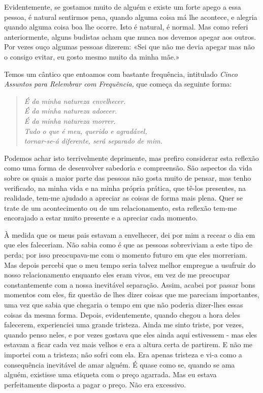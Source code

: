 Evidentemente, se gostamos muito de alguém e existe um forte apego a
essa pessoa, é natural sentirmos pena, quando alguma coisa má lhe
acontece, e alegria quando alguma coisa boa lhe ocorre. Isto é natural,
é normal. Mas como referi anteriormente, alguns budistas acham que nunca
nos devemos apegar aos outros. Por vezes ouço algumas pessoas dizerem:
«Sei que não me devia apegar mas não o consigo evitar, eu gosto mesmo
muito da minha mãe.»

Temos um cântico que entoamos com bastante frequência, intitulado
\emph{Cinco Assuntos para Relembrar com Frequência,} que começa da
seguinte forma:

\begin{quote}
\itshape
É da minha natureza envelhecer.\\
É da minha natureza adoecer.\\
É da minha natureza morrer.\\
Tudo o que é meu, querido e agradável,\\
tornar-se-á diferente, será separado de mim.
\end{quote}

Podemos achar isto terrivelmente deprimente, mas prefiro considerar esta
reflexão como uma forma de desenvolver sabedoria e compreensão. São
aspectos da vida sobre os quais a maior parte das pessoas não gosta
muito de pensar, mas tenho verificado, na minha vida e na minha própria
prática, que tê-los presentes, na realidade, tem-me ajudado a apreciar
as coisas de forma mais plena. Quer se trate de um acontecimento ou de
um relacionamento, esta reflexão tem-me encorajado a estar muito
presente e a apreciar cada momento.

À medida que os meus pais estavam a envelhecer, dei por mim a recear o
dia em que eles faleceriam. Não sabia como é que as pessoas sobreviviam
a este tipo de perda; por isso \mbox{preocupava-me} com o momento futuro em que
eles morreriam. Mas depois percebi que o meu tempo seria talvez melhor
empregue a usufruir do nosso relacionamento enquanto eles eram vivos, em
vez de me preocupar constantemente com a nossa inevitável separação.
Assim, acabei por passar bons momentos com eles, fiz questão de lhes
dizer coisas que me pareciam importantes, uma vez que sabia que chegaria
o tempo em que não poderia dizer-lhes essas coisas da mesma forma.
Depois, evidentemente, quando chegou a hora deles falecerem,
experienciei uma grande tristeza. Ainda me sinto triste, por vezes,
quando penso neles, e por vezes gostava que eles ainda aqui estivessem -
mas eles estavam a ficar cada vez mais velhos e era a altura certa de
partirem. E não me importei com a tristeza; não sofri com ela. Era
apenas tristeza e vi-a como a consequência inevitável de amar alguém. É
quase como se, quando se ama alguém, existisse uma etiqueta com o preço
agarrada. Mas eu estava perfeitamente disposta a pagar o preço. Não era
excessivo.

